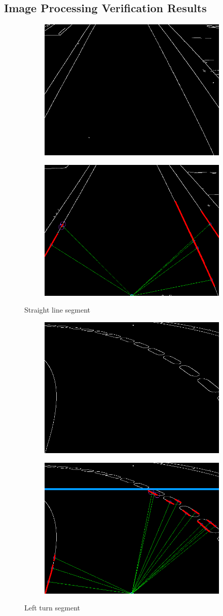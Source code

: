 \documentclass [10pt]{article}
\begin{document}
\subsection{Image Processing Verification Results}

 \begin{figure}[h]
\centering
\begin{subfigure}
  \centering
  \includegraphics[width=.4\linewidth]{figures/straight_canny.png}
\end{subfigure}%
\begin{subfigure}
  \centering
  \includegraphics[width=.4\linewidth]{figures/straight_h.png}
\end{subfigure}
\caption{Straight line segment}
\label{fig:Fig2}
\end{figure}


\begin{figure}[h]
\centering
\begin{subfigure}
  \centering
  \includegraphics[width=.4\linewidth]{figures/left_c.png}
\end{subfigure}%
\begin{subfigure}
  \centering
  \includegraphics[width=.4\linewidth]{figures/left_h.png}
\end{subfigure}
\caption{Left turn segment}
\label{fig:Fig3}
\end{figure}
\end{document}

